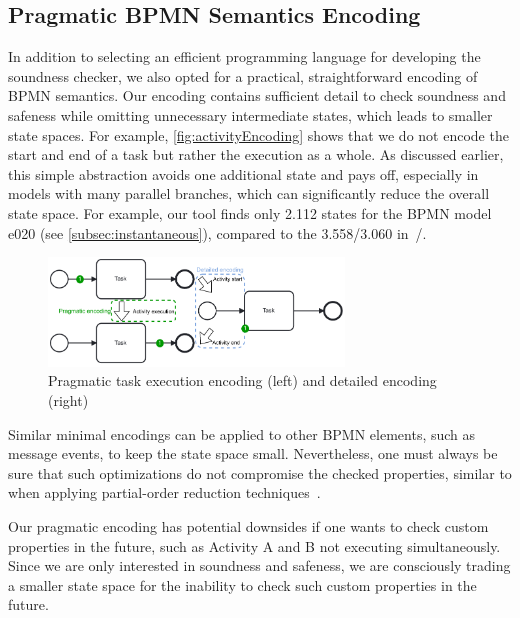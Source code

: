 \documentclass[runningheads]{llncs}
\begin{document}
\subsection{Pragmatic BPMN Semantics Encoding}
In addition to selecting an efficient programming language for developing the soundness checker, we also opted for a practical, straightforward encoding of BPMN semantics.
Our encoding contains sufficient detail to check soundness and safeness while omitting unnecessary intermediate states, which leads to smaller state spaces.
For example, \autoref{fig:activityEncoding} shows that we do not encode the start and end of a task but rather the execution as a whole.
As discussed earlier, this simple abstraction avoids one additional state and pays off, especially in models with many parallel branches, which can significantly reduce the overall state space.
For example, our tool finds only 2.112 states for the BPMN model \textsf{e020} (see \autoref{subsec:instantaneous}), compared to the 3.558/3.060  in~\cite{houhouFirstOrderLogicVerification2022}/\cite{krauterFormalizationAnalysisBPMN2023}.

\begin{figure}[ht]
	\centering
	\includegraphics[width=0.7\textwidth]{images/pragmatic-encoding}
	\caption{Pragmatic task execution encoding (left) and detailed encoding (right)}
	\label{fig:activityEncoding}
\end{figure}

Similar minimal encodings can be applied to other BPMN elements, such as message events, to keep the state space small.
Nevertheless, one must always be sure that such optimizations do not compromise the checked properties, similar to when applying partial-order reduction techniques~\cite{clarkeHandbookModelChecking2018}.

Our pragmatic encoding has potential downsides if one wants to check custom properties in the future, such as Activity A and B not executing simultaneously.
Since we are only interested in soundness and safeness, we are consciously trading a smaller state space for the inability to check such custom properties in the future.
\end{document}
